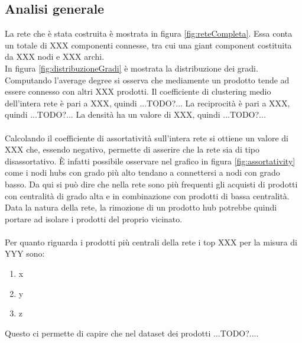 \subsection{Analisi generale}
La rete che è stata costruita è mostrata in figura \ref{fig:reteCompleta}. Essa conta un totale di XXX componenti connesse, tra cui una giant component costituita da XXX nodi e XXX archi. \\
In figura \ref{fig:distribuzioneGradi} è mostrata la distribuzione dei gradi. Computando l'average degree si osserva che mediamente un prodotto tende ad essere connesso con altri XXX prodotti. Il coefficiente di clustering medio dell'intera rete è pari a XXX, quindi ...TODO?... La reciprocità è pari a XXX, quindi ...TODO?... La densità ha un valore di XXX, quindi ...TODO?... \\\\
Calcolando il coefficiente di assortatività sull'intera rete si ottiene un valore di XXX che, essendo negativo, permette di asserire che la rete sia di tipo disassortativo. È infatti possibile osservare nel grafico in figura \ref{fig:assortativity} come i nodi hubs con grado più alto tendano a connettersi a nodi con grado basso. Da qui si può dire che nella rete sono più frequenti gli acquisti di prodotti con centralità di grado alta e in combinazione con prodotti di bassa centralità. Data la natura della rete, la rimozione di un prodotto hub potrebbe quindi portare ad isolare i prodotti del proprio vicinato. %
\\\\
Per quanto riguarda i prodotti più centrali della rete i top XXX per la misura di YYY sono:
\begin{enumerate}
    \item x
    \item y
    \item z
\end{enumerate}
Questo ci permette di capire che nel dataset dei prodotti ...TODO?....


